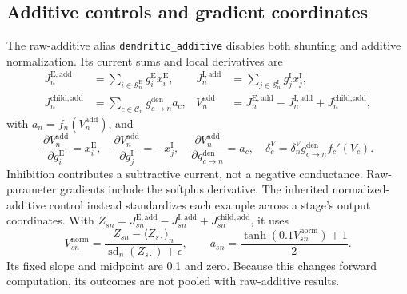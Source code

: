\subsection{Additive controls and gradient coordinates}

The raw-additive alias \texttt{dendritic\_additive} disables both shunting and additive normalization. Its current sums and local derivatives are
\begin{align}
J_n^{\mathrm E,\mathrm{add}}&=\sum_{i\in\mathcal S_n^{\mathrm E}}g_i^{\mathrm E}x_i^{\mathrm E},&
J_n^{\mathrm I,\mathrm{add}}&=\sum_{j\in\mathcal S_n^{\mathrm I}}g_j^{\mathrm I}x_j^{\mathrm I},\\
J_n^{\mathrm{child},\mathrm{add}}&=\sum_{c\in\mathcal C_n}g_{c\to n}^{\mathrm{den}}a_c,&
V_n^{\mathrm{add}}&=J_n^{\mathrm E,\mathrm{add}}-J_n^{\mathrm I,\mathrm{add}}+J_n^{\mathrm{child},\mathrm{add}},
\label{eq:s_additive_forward}
\end{align}
with $a_n=f_n(V_n^{\mathrm{add}})$, and
\begin{equation}
\frac{\partial V_n^{\mathrm{add}}}{\partial g_i^{\mathrm E}}=x_i^{\mathrm E},\quad
\frac{\partial V_n^{\mathrm{add}}}{\partial g_j^{\mathrm I}}=-x_j^{\mathrm I},\quad
\frac{\partial V_n^{\mathrm{add}}}{\partial g_{c\to n}^{\mathrm{den}}}=a_c,\quad
\delta_c^V=\delta_n^Vg_{c\to n}^{\mathrm{den}}f_c'(V_c).
\label{eq:s_additive_derivatives}
\end{equation}
Inhibition contributes a subtractive current, not a negative conductance. Raw-parameter gradients include the softplus derivative. The inherited normalized-additive control instead standardizes each example across a stage's output coordinates. With $Z_{sn}=J_{sn}^{\mathrm E,\mathrm{add}}-J_{sn}^{\mathrm I,\mathrm{add}}+J_{sn}^{\mathrm{child},\mathrm{add}}$, it uses
\begin{equation}
V_{sn}^{\mathrm{norm}}=\frac{Z_{sn}-\langle Z_{s\cdot}\rangle_n}{\operatorname{sd}_n(Z_{s\cdot})+\epsilon},
\qquad a_{sn}=\frac{\tanh(0.1V_{sn}^{\mathrm{norm}})+1}{2}.
\label{eq:s_historical_normalized_additive}
\end{equation}
Its fixed slope and midpoint are 0.1 and zero. Because this changes forward computation, its outcomes are not pooled with raw-additive results.

